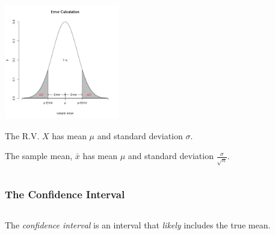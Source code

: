 \begin{frame}

  \begin{columns}[T]

    \begin{column}[T]{0.5\textwidth}
      \centerline{\includegraphics[width=5cm]{img/confidenceInterval}}
      The R.V. $X$ has mean $\mu$ and standard deviation $\sigma$.

      The sample mean, $\bar{x}$ has {\color{red}mean $\mu$} and
      {\color{red} standard deviation $\frac{\sigma}{\sqrt{n}}$}.

    \end{column}


  \end{columns}


\end{frame}



\begin{frame}
  \frametitle{The Confidence Interval}

  \begin{columns}
    \begin{definition}
      The \textit{\color{red}confidence interval} is an interval that \textit{\color{red}likely}
      includes the true mean.
    \end{definition}


    

  \end{columns}

\end{frame}

